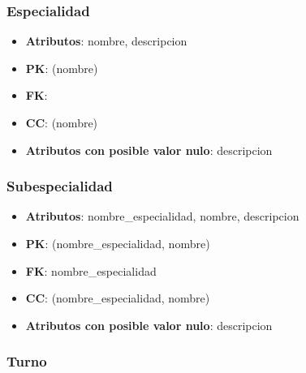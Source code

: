 \documentclass[a4paper,11pt]{article}
\begin{document}
\subsubsection{\textbf{Especialidad}}

\begin{itemize}

\item 
\textbf{Atributos}: nombre, descripcion

\item 
\textbf{PK}: (nombre)

\item
\textbf{FK}:

\item 
\textbf{CC}: (nombre)

\item 
\textbf{Atributos con posible valor nulo}: descripcion

\end{itemize}
\subsubsection{\textbf{Subespecialidad}}

\begin{itemize}

\item 
\textbf{Atributos}: nombre\_especialidad, nombre, descripcion

\item 
\textbf{PK}: (nombre\_especialidad, nombre)

\item
\textbf{FK}: nombre\_especialidad

\item 
\textbf{CC}: (nombre\_especialidad, nombre)

\item 
\textbf{Atributos con posible valor nulo}: descripcion

\end{itemize}
\subsubsection{\textbf{Turno}}
\end{document}
